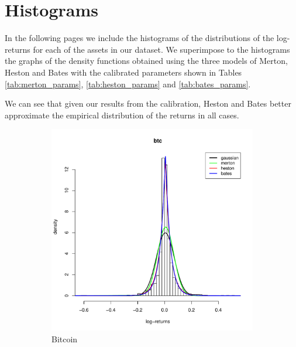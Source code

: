 \chapter{Histograms}
\label{app:hist}

In the following pages we include the histograms of the distributions of the log-returns for each of the assets in our dataset. We superimpose to the histograms the graphs of the density functions obtained using the three models of Merton, Heston and Bates with the calibrated parameters shown in Tables \ref{tab:merton_params}, \ref{tab:heston_params} and \ref{tab:bates_params}.

We can see that given our results from the calibration, Heston and Bates better approximate the empirical distribution of the returns in all cases.

\begin{figure}
	\small
	\centering
	\begin{subfigure}{0.44\textwidth}
		\centering
		\includegraphics[width=\linewidth]{Images/hist_btc.pdf}
		\caption{Bitcoin}
	\end{subfigure}
	\begin{subfigure}{0.44\textwidth}
		\centering

\end{subfigure}
\end{figure}
